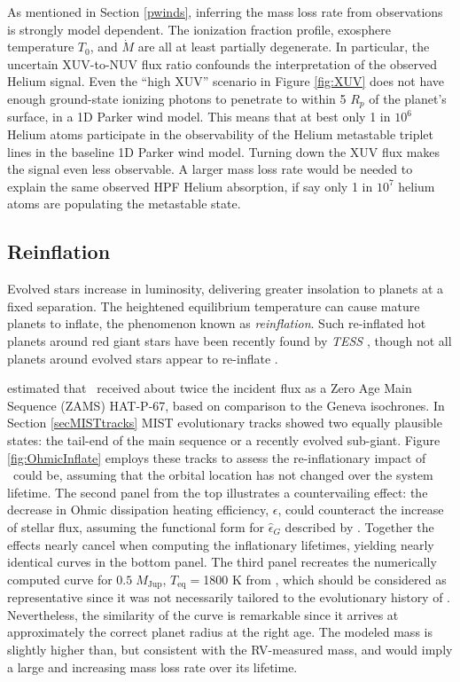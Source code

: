 \documentclass[twocolumn]{aastex631}
\newcommand{\hatpb}{\object{HAT-P-67 b}}
\begin{document}
As mentioned in Section \ref{pwinds}, inferring the mass loss rate from observations is strongly model dependent.  The ionization fraction profile, exosphere temperature $T_0$, and $\dot{M}$ are all at least partially degenerate.  In particular, the uncertain XUV-to-NUV flux ratio confounds the interpretation of the observed Helium signal.  Even the ``high XUV'' scenario in Figure \ref{fig:XUV} does not have enough ground-state ionizing photons to penetrate to within 5 $R_p$ of the planet's surface, in a 1D Parker wind model.  This means that at best only 1 in $10^{6}$ Helium atoms participate in the observability of the Helium metastable triplet lines in the baseline 1D Parker wind model.  Turning down the XUV flux makes the signal even less observable.  A larger mass loss rate would be needed to explain the same observed HPF Helium absorption, if say only 1 in $10^{7}$ helium atoms are populating the metastable state.


\subsection{Reinflation}
Evolved stars increase in luminosity, delivering greater insolation to planets at a fixed separation.  The heightened equilibrium temperature can cause mature planets to inflate, the phenomenon known as \emph{reinflation}.  Such re-inflated hot planets around red giant stars have been recently found by \emph{TESS} \citep{2022AJ....163..120G,2023arXiv230306728G}, though not all planets around evolved stars appear to re-inflate \citep{2022AJ....163...53S}.

\citet{2017AJ....153..211Z} estimated that \hatpb~received about twice the incident flux as a Zero Age Main Sequence (ZAMS) HAT-P-67, based on comparison to the Geneva isochrones. In Section \ref{secMISTtracks} MIST evolutionary tracks showed two equally plausible states: the tail-end of the main sequence or a recently evolved sub-giant.  Figure \ref{fig:OhmicInflate} employs these tracks to assess the re-inflationary impact of \hatpb~could be, assuming that the orbital location has not changed over the system lifetime.  The second panel from the top illustrates a countervailing effect: the decrease in Ohmic dissipation heating efficiency, $\epsilon$, could counteract the increase of stellar flux, assuming the functional form for $\hat{\epsilon}_G$ described by \citet{2018AJ....155..214T}.  Together the effects nearly cancel when computing the inflationary lifetimes, yielding nearly identical curves in the bottom panel.  The third panel recreates the numerically computed curve for $0.5\;M_\mathrm{Jup}$, $T_\mathrm{eq}=$1800 K from \citep{2011ApJ...738....1B}, which should be considered as representative since it was not necessarily tailored to the evolutionary history of \hatpb.  Nevertheless, the similarity of the curve is remarkable since it arrives at approximately the correct planet radius at the right age.  The modeled mass is slightly higher than, but consistent with the RV-measured mass, and would imply a large and increasing mass loss rate over its lifetime.
\end{document}
